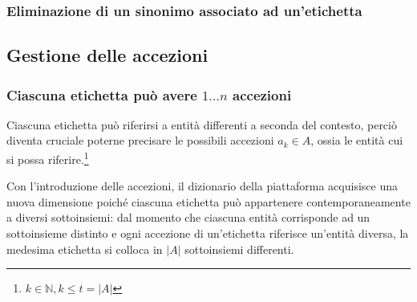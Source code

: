 \documentclass[10pt,a4paper,headinclude,footinclude,hidelinks]{scrreprt} %
\begin{document}


	\subsubsection{Eliminazione di un sinonimo associato ad un'etichetta}

	\subsection{Gestione delle accezioni}
	\subsubsection{Ciascuna etichetta può avere $1\ldots n$ accezioni}
	Ciascuna etichetta può riferirsi a entità differenti a seconda del contesto, perciò diventa cruciale poterne precisare le possibili accezioni $a_k \in A$, ossia le entità cui si possa riferire.\footnote{$k \in \mathbb{N}, k \leq t=\left|A\right|$}
	
	Con l'introduzione delle accezioni, il dizionario della piattaforma acquisisce una nuova dimensione poiché ciascuna etichetta può appartenere contemporaneamente a diversi sottoinsiemi: dal momento che ciascuna entità corrisponde ad un sottoinsieme distinto e ogni accezione di un'etichetta riferisce un'entità diversa, la medesima etichetta si colloca in $\left|A\right|$ sottoinsiemi differenti.
\end{document}
